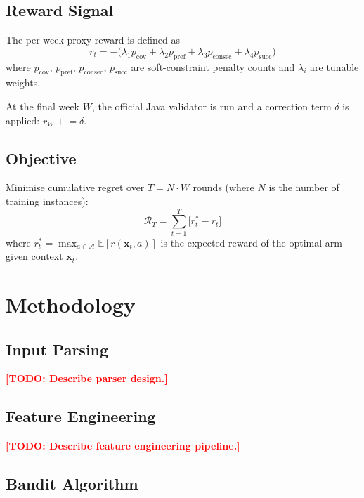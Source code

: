 \documentclass[12pt, a4paper]{article}
\newcommand{\xt}{\mathbf{x}_t}          %
\newcommand{\reward}{r_t}               %
\newcommand{\regret}{\mathcal{R}_T}     %
\newcommand{\TODO}[1]{\textbf{\textcolor{red}{[TODO: #1]}}}
\begin{document}
\subsection{Reward Signal}

The per-week proxy reward is defined as
\begin{equation}
  \reward = -\bigl(\lambda_1 p_{\text{cov}} + \lambda_2 p_{\text{pref}}
            + \lambda_3 p_{\text{consec}} + \lambda_4 p_{\text{succ}}\bigr)
\end{equation}
where $p_{\text{cov}}$, $p_{\text{pref}}$, $p_{\text{consec}}$,
$p_{\text{succ}}$ are soft-constraint penalty counts and
$\lambda_i$ are tunable weights.

At the final week $W$, the official Java validator is run and a correction
term $\delta$ is applied: $r_W \mathrel{+}= \delta$.

\subsection{Objective}

Minimise cumulative regret over $T = N \cdot W$ rounds (where $N$ is the
number of training instances):
\begin{equation}
  \regret = \sum_{t=1}^{T} \bigl[r^*_t - r_t\bigr]
\end{equation}
where $r^*_t = \max_{a \in \mathcal{A}} \mathbb{E}[r(\xt, a)]$ is the
expected reward of the optimal arm given context $\xt$.

\section{Methodology}
\label{sec:method}

\subsection{Input Parsing}

\TODO{Describe parser design.}

\subsection{Feature Engineering}

\TODO{Describe feature engineering pipeline.}

\subsection{Bandit Algorithm}
\end{document}
